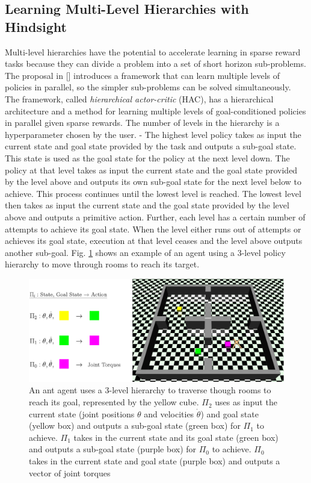 \documentclass[conference]{IEEEtran}
\begin{document}
\subsection{Learning Multi-Level Hierarchies with Hindsight}
Multi-level hierarchies have the potential to accelerate learning in sparse reward tasks because they can divide a problem into a set of short horizon sub-problems. The proposal in [\cite{levy2019learning}] introduces a framework that can learn multiple levels of policies in parallel, so the simpler sub-problems can be solved simultaneously. The framework, called \textit{hierarchical actor-critic} (HAC), has a hierarchical architecture and a method for learning multiple levels of goal-conditioned policies in parallel given sparse rewards. The number of levels in the hierarchy is a hyperparameter chosen by the user.
-
The highest level policy takes as input the current state and goal state provided by the task and outputs a sub-goal state. This state is used as the goal state for the policy at the next level down. The policy at that level takes as input the current state and the goal state provided by the level above and outputs its own sub-goal state for the next level below to achieve. This process continues until the lowest level is reached. The lowest level then takes as input the current state and the goal state provided by the level above and outputs a primitive action. Further, each level has a certain number of attempts to achieve its goal state. When the level either runs out of attempts or achieves its goal state, execution at that level ceases and the level above outputs another sub-goal. Fig. \ref{fig:mutilevel_her_example} shows an example of an agent using a 3-level policy hierarchy to move through rooms to reach its target.
\begin{figure}[ht]
\centering
\includegraphics[width=0.9\columnwidth]{img/MultiLevelHER_example.png}
\caption{An ant agent uses a 3-level hierarchy to traverse though rooms to reach its goal, represented by the yellow cube. $\Pi_2$ uses as input the current state (joint positions $\theta$ and velocities $\dot{\theta}$) and goal state (yellow box) and outputs a sub-goal state (green box) for $\Pi_1$ to achieve. $\Pi_1$ takes in the current state and its goal state (green box) and outputs a sub-goal state (purple box) for $\Pi_0$ to achieve. $\Pi_0$ takes in the current state and goal state (purple box) and outputs a vector of joint torques}
\label{fig:mutilevel_her_example}
\end{figure}
\end{document}
